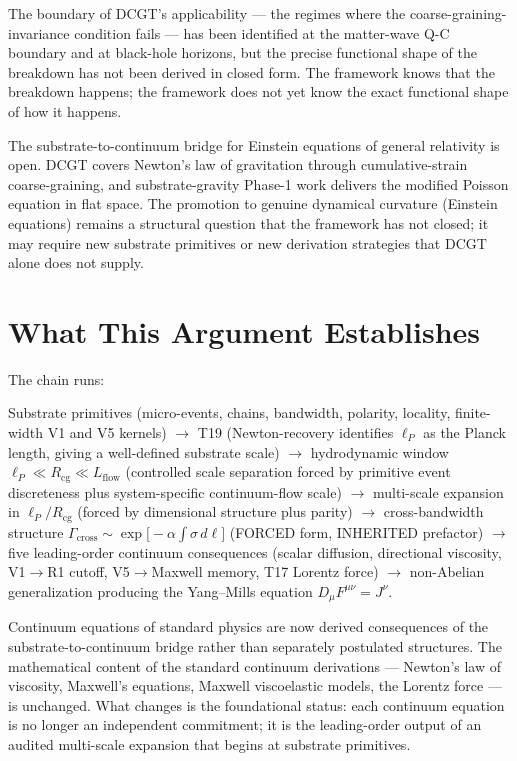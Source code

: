 \documentclass[11pt,a4paper]{article}
\begin{document}
The boundary of DCGT's applicability --- the regimes where the coarse-graining-invariance condition fails --- has been identified at the matter-wave Q-C boundary and at black-hole horizons, but the precise functional shape of the breakdown has not been derived in closed form. The framework knows that the breakdown happens; the framework does not yet know the exact functional shape of how it happens.

The substrate-to-continuum bridge for Einstein equations of general relativity is open. DCGT covers Newton's law of gravitation through cumulative-strain coarse-graining, and substrate-gravity Phase-1 work delivers the modified Poisson equation in flat space. The promotion to genuine dynamical curvature (Einstein equations) remains a structural question that the framework has not closed; it may require new substrate primitives or new derivation strategies that DCGT alone does not supply.

\section{What This Argument Establishes}

The chain runs:

Substrate primitives (micro-events, chains, bandwidth, polarity, locality, finite-width V1 and V5 kernels) $\to$ T19 (Newton-recovery identifies $\ell_P$ as the Planck length, giving a well-defined substrate scale) $\to$ hydrodynamic window $\ell_P \ll R_{\mathrm{cg}} \ll L_{\mathrm{flow}}$ (controlled scale separation forced by primitive event discreteness plus system-specific continuum-flow scale) $\to$ multi-scale expansion in $\ell_P/R_{\mathrm{cg}}$ (forced by dimensional structure plus parity) $\to$ cross-bandwidth structure $\Gamma_{\mathrm{cross}} \sim \exp\bigl[-\alpha \int \sigma\, d\ell\bigr]$ (FORCED form, INHERITED prefactor) $\to$ five leading-order continuum consequences (scalar diffusion, directional viscosity, V1$\to$R1 cutoff, V5$\to$Maxwell memory, T17 Lorentz force) $\to$ non-Abelian generalization producing the Yang--Mills equation $D_\mu F^{\mu\nu} = J^\nu$.

Continuum equations of standard physics are now derived consequences of the substrate-to-continuum bridge rather than separately postulated structures. The mathematical content of the standard continuum derivations --- Newton's law of viscosity, Maxwell's equations, Maxwell viscoelastic models, the Lorentz force --- is unchanged. What changes is the foundational status: each continuum equation is no longer an independent commitment; it is the leading-order output of an audited multi-scale expansion that begins at substrate primitives.
\end{document}
